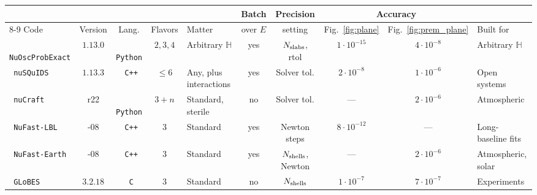 \documentclass[final,5p,times,twocolumn]{elsarticle}
\newcommand{\fig}{Fig.}
\providecommand{\DIFaddtex}[1]{{\protect\color{blue} \sf #1}} %
\providecommand{\DIFaddFL}[1]{\DIFadd{#1}} %
\providecommand{\DIFadd}[1]{\DIFaddtex{#1}} %
\begin{document}
{\def\arraystretch{1.2}
\begin{table}[t!]
\centering
\begin{tabular}{l c c c p{1.75cm} c c c c p{1.85cm}}
 \hline\hline
 & & & & & \DIFaddFL{Batch }& \DIFaddFL{Precision }& \multicolumn{2}{c}{Accuracy} & \\
 \cline{8-9}
 \DIFaddFL{Code }& \DIFaddFL{Version }& \DIFaddFL{Lang. }& \DIFaddFL{Flavors }& \DIFaddFL{Matter }& \DIFaddFL{over $E$ }& \DIFaddFL{setting }& \DIFaddFL{\fig~\ref{fig:plane} }& \DIFaddFL{\fig~\ref{fig:prem_plane} }& \DIFaddFL{Built for }\\
 \hline
 {\tt \DIFaddFL{NuOscProbExact}}
   & \DIFaddFL{$1.13.0$ }& {\tt \DIFaddFL{Python}} & \DIFaddFL{$2,3,4$ }& \DIFaddFL{Arbitrary $\mathbb{H}$ }& \DIFaddFL{yes
   }& \DIFaddFL{$N_{\rm slabs}$, rtol }& \DIFaddFL{$1 \cdot 10^{-15}$ }& \DIFaddFL{$4 \cdot 10^{-8}$
   }& \DIFaddFL{Arbitrary $\mathbb{H}$ }\\
 {\tt \DIFaddFL{nuSQuIDS}}\DIFaddFL{\ }\cite{Delgado:2014kpa, NuSQuIDS}
   & \DIFaddFL{$1.13.3$ }& {\tt \DIFaddFL{C++}} & \DIFaddFL{$\leq 6$ }& \DIFaddFL{Any, plus interactions }& \DIFaddFL{yes }& \DIFaddFL{Solver tol.
   }& \DIFaddFL{$2 \cdot 10^{-8}$ }& \DIFaddFL{$1 \cdot 10^{-6}$ }& \DIFaddFL{Open systems }\\
 {\tt \DIFaddFL{nuCraft}}\DIFaddFL{\ }\cite{nuCraft}
   & \DIFaddFL{r22 }& {\tt \DIFaddFL{Python}} & \DIFaddFL{$3+n$ }& \DIFaddFL{Standard, sterile }& \DIFaddFL{no}\rlap{$^{\ddagger}$}
   & \DIFaddFL{Solver tol. }& \DIFaddFL{--- }& \DIFaddFL{$2 \cdot 10^{-6}$ }& \DIFaddFL{Atmospheric }\\
 {\tt \DIFaddFL{NuFast-LBL}}\DIFaddFL{\ }\cite{NuFastLBL}
   & \DIFaddFL{2026-08 }& {\tt \DIFaddFL{C++}} & \DIFaddFL{$3$ }& \DIFaddFL{Standard }& \DIFaddFL{yes }& \DIFaddFL{Newton steps
   }& \DIFaddFL{$8 \cdot 10^{-12}$ }& \DIFaddFL{--- }& \DIFaddFL{Long-baseline fits }\\
 {\tt \DIFaddFL{NuFast-Earth}}\DIFaddFL{\ }\cite{NuFastEarth}
   & \DIFaddFL{2026-08 }& {\tt \DIFaddFL{C++}} & \DIFaddFL{$3$ }& \DIFaddFL{Standard }& \DIFaddFL{yes }& \DIFaddFL{$N_{\rm shells}$, Newton
   }& \DIFaddFL{--- }& \DIFaddFL{$2 \cdot 10^{-6}$ }& \DIFaddFL{Atmospheric, solar }\\
 {\tt \DIFaddFL{GLoBES}}\DIFaddFL{\ }\cite{GLoBES}
   & \DIFaddFL{$3.2.18$ }& {\tt \DIFaddFL{C}} & \DIFaddFL{$3$}\rlap{$^{\dagger}$} & \DIFaddFL{Standard }& \DIFaddFL{no
   }& \DIFaddFL{$N_{\rm shells}$ }& \DIFaddFL{$1 \cdot 10^{-7}$ }& \DIFaddFL{$7 \cdot 10^{-7}$
   }& \DIFaddFL{Experiments }\\

\end{tabular}
\end{table}}
\end{document}

